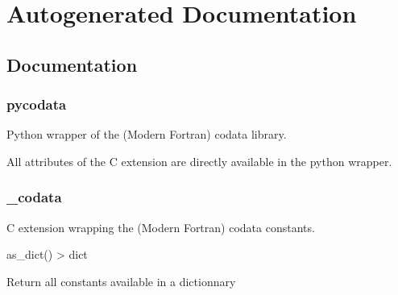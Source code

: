 \documentclass[a4paper,10pt,english]{sphinxmanual}
\begin{document}
\sphinxstepscope


\chapter{Autogenerated Documentation}
\label{\detokenize{api/index:autogenerated-documentation}}\label{\detokenize{api/index::doc}}
\sphinxstepscope


\section{Documentation}
\label{\detokenize{api/codedoc:documentation}}\label{\detokenize{api/codedoc::doc}}

\subsection{pycodata}
\label{\detokenize{api/codedoc:module-pycodata}}\label{\detokenize{api/codedoc:pycodata}}
\sphinxAtStartPar
Python wrapper of the (Modern Fortran) codata library.

\sphinxAtStartPar
All attributes of the C extension {\hyperref[\detokenize{api/codedoc:module-pycodata._codata}]{}} are directly
available in the python wrapper.


\subsection{\_codata}
\label{\detokenize{api/codedoc:module-pycodata._codata}}\label{\detokenize{api/codedoc:codata}}
\sphinxAtStartPar
C extension wrapping the (Modern Fortran) codata constants.

\begin{fulllineitems}
\label{\detokenize{api/codedoc:pycodata._codata.as_dict}}
\pysigstartsignatures
{}
\pysigstopsignatures
\sphinxAtStartPar
as\_dict() \textendash{}\textgreater{} dict

\sphinxAtStartPar
Return all constants available in a dictionnary

\end{fulllineitems}
\end{document}
